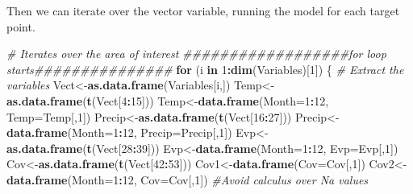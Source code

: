 \documentclass[
  10pt,
  b5paper,
]{book}
\newenvironment{Shaded}{\begin{snugshade}}{\end{snugshade}}
\newcommand{\CommentTok}[1]{\textcolor[rgb]{0.56,0.35,0.01}{\textit{#1}}}
\newcommand{\ControlFlowTok}[1]{\textcolor[rgb]{0.13,0.29,0.53}{\textbf{#1}}}
\newcommand{\DataTypeTok}[1]{\textcolor[rgb]{0.13,0.29,0.53}{#1}}
\newcommand{\DecValTok}[1]{\textcolor[rgb]{0.00,0.00,0.81}{#1}}
\newcommand{\KeywordTok}[1]{\textcolor[rgb]{0.13,0.29,0.53}{\textbf{#1}}}
\newcommand{\NormalTok}[1]{#1}
\newcommand{\OperatorTok}[1]{\textcolor[rgb]{0.81,0.36,0.00}{\textbf{#1}}}
\begin{document}
Then we can iterate over the vector variable, running the model for each target point.

\begin{Shaded}
\begin{Highlighting}[]
\CommentTok{# Iterates over the area of interest}
\CommentTok{##################for loop starts###############}
\ControlFlowTok{for}\NormalTok{ (i }\ControlFlowTok{in} \DecValTok{1}\OperatorTok{:}\KeywordTok{dim}\NormalTok{(Variables)[}\DecValTok{1}\NormalTok{]) \{}
\CommentTok{# Extract the variables }
\NormalTok{Vect<-}\KeywordTok{as.data.frame}\NormalTok{(Variables[i,])}
\NormalTok{Temp<-}\KeywordTok{as.data.frame}\NormalTok{(}\KeywordTok{t}\NormalTok{(Vect[}\DecValTok{4}\OperatorTok{:}\DecValTok{15}\NormalTok{]))}
\NormalTok{Temp<-}\KeywordTok{data.frame}\NormalTok{(}\DataTypeTok{Month=}\DecValTok{1}\OperatorTok{:}\DecValTok{12}\NormalTok{, }\DataTypeTok{Temp=}\NormalTok{Temp[,}\DecValTok{1}\NormalTok{])}
\NormalTok{Precip<-}\KeywordTok{as.data.frame}\NormalTok{(}\KeywordTok{t}\NormalTok{(Vect[}\DecValTok{16}\OperatorTok{:}\DecValTok{27}\NormalTok{]))}
\NormalTok{Precip<-}\KeywordTok{data.frame}\NormalTok{(}\DataTypeTok{Month=}\DecValTok{1}\OperatorTok{:}\DecValTok{12}\NormalTok{, }\DataTypeTok{Precip=}\NormalTok{Precip[,}\DecValTok{1}\NormalTok{])}
\NormalTok{Evp<-}\KeywordTok{as.data.frame}\NormalTok{(}\KeywordTok{t}\NormalTok{(Vect[}\DecValTok{28}\OperatorTok{:}\DecValTok{39}\NormalTok{]))}
\NormalTok{Evp<-}\KeywordTok{data.frame}\NormalTok{(}\DataTypeTok{Month=}\DecValTok{1}\OperatorTok{:}\DecValTok{12}\NormalTok{, }\DataTypeTok{Evp=}\NormalTok{Evp[,}\DecValTok{1}\NormalTok{])}
\NormalTok{Cov<-}\KeywordTok{as.data.frame}\NormalTok{(}\KeywordTok{t}\NormalTok{(Vect[}\DecValTok{42}\OperatorTok{:}\DecValTok{53}\NormalTok{]))}
\NormalTok{Cov1<-}\KeywordTok{data.frame}\NormalTok{(}\DataTypeTok{Cov=}\NormalTok{Cov[,}\DecValTok{1}\NormalTok{])}
\NormalTok{Cov2<-}\KeywordTok{data.frame}\NormalTok{(}\DataTypeTok{Month=}\DecValTok{1}\OperatorTok{:}\DecValTok{12}\NormalTok{, }\DataTypeTok{Cov=}\NormalTok{Cov[,}\DecValTok{1}\NormalTok{])}
\CommentTok{#Avoid calculus over Na values }

\end{Highlighting}
\end{Shaded}
\end{document}
